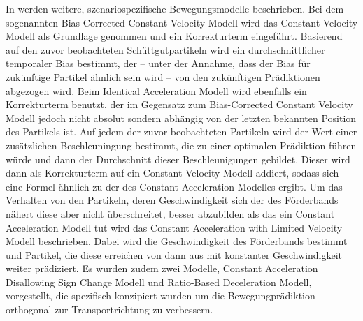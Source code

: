 In \cite{Pfaff2018} werden weitere, szenariospezifische Bewegungsmodelle beschrieben.
Bei dem sogenannten Bias-Corrected Constant Velocity Modell wird das Constant Velocity Modell als Grundlage genommen und ein Korrekturterm eingeführt.
Basierend auf den zuvor beobachteten Schüttgutpartikeln wird ein durchschnittlicher temporaler Bias bestimmt, der -- unter der Annahme, dass der Bias für zukünftige Partikel ähnlich sein wird --
von den zukünftigen Prädiktionen abgezogen wird.
Beim Identical Acceleration Modell wird ebenfalls ein Korrekturterm benutzt, 
der im Gegensatz zum Bias-Corrected Constant Velocity Modell jedoch nicht absolut sondern abhängig von der letzten bekannten Position des Partikels ist.
Auf jedem der zuvor beobachteten Partikeln wird der Wert einer zusätzlichen Beschleuningung bestimmt, die zu einer optimalen Prädiktion führen würde und dann der Durchschnitt dieser Beschleunigungen gebildet.
Dieser wird dann als Korrekturterm auf ein Constant Velocity Modell addiert, sodass sich eine Formel ähnlich zu der des Constant Acceleration Modelles ergibt.
Um das Verhalten von den Partikeln, deren Geschwindigkeit sich der des Förderbands nähert diese aber nicht überschreitet, besser abzubilden als das ein Constant Acceleration Modell tut
wird das Constant Acceleration with Limited Velocity Modell beschrieben. 
Dabei wird die Geschwindigkeit des Förderbands bestimmt und Partikel, die diese erreichen von dann aus mit konstanter Geschwindigkeit weiter prädiziert.
Es wurden zudem zwei Modelle, Constant Acceleration Disallowing Sign Change Modell und Ratio-Based Deceleration Modell, vorgestellt, 
die spezifisch konzipiert wurden um die Bewegungprädiktion orthogonal zur Transportrichtung zu verbessern.

